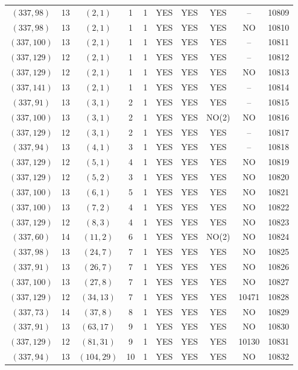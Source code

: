 \begin{longtable}{|c|c|c|c|c|c|c|c|c|c|}
$(337, 98)$ & 13 & $(2, 1)$ & 1 & 1 & YES & YES & YES & -- & 10809\\
$(337, 98)$ & 13 & $(2, 1)$ & 1 & 1 & YES & YES & YES & NO & 10810\\
$(337, 100)$ & 13 & $(2, 1)$ & 1 & 1 & YES & YES & YES & -- & 10811\\
$(337, 129)$ & 12 & $(2, 1)$ & 1 & 1 & YES & YES & YES & -- & 10812\\
$(337, 129)$ & 12 & $(2, 1)$ & 1 & 1 & YES & YES & YES & NO & 10813\\
$(337, 141)$ & 13 & $(2, 1)$ & 1 & 1 & YES & YES & YES & -- & 10814\\
$(337, 91)$ & 13 & $(3, 1)$ & 2 & 1 & YES & YES & YES & -- & 10815\\
$(337, 100)$ & 13 & $(3, 1)$ & 2 & 1 & YES & YES & NO(2) & NO & 10816\\
$(337, 129)$ & 12 & $(3, 1)$ & 2 & 1 & YES & YES & YES & -- & 10817\\
$(337, 94)$ & 13 & $(4, 1)$ & 3 & 1 & YES & YES & YES & -- & 10818\\
$(337, 129)$ & 12 & $(5, 1)$ & 4 & 1 & YES & YES & YES & NO & 10819\\
$(337, 129)$ & 12 & $(5, 2)$ & 3 & 1 & YES & YES & YES & NO & 10820\\
$(337, 100)$ & 13 & $(6, 1)$ & 5 & 1 & YES & YES & YES & NO & 10821\\
$(337, 100)$ & 13 & $(7, 2)$ & 4 & 1 & YES & YES & YES & NO & 10822\\
$(337, 129)$ & 12 & $(8, 3)$ & 4 & 1 & YES & YES & YES & NO & 10823\\
$(337, 60)$ & 14 & $(11, 2)$ & 6 & 1 & YES & YES & NO(2) & NO & 10824\\
$(337, 98)$ & 13 & $(24, 7)$ & 7 & 1 & YES & YES & YES & NO & 10825\\
$(337, 91)$ & 13 & $(26, 7)$ & 7 & 1 & YES & YES & YES & NO & 10826\\
$(337, 100)$ & 13 & $(27, 8)$ & 7 & 1 & YES & YES & YES & NO & 10827\\
$(337, 129)$ & 12 & $(34, 13)$ & 7 & 1 & YES & YES & YES & 10471 & 10828\\
$(337, 73)$ & 14 & $(37, 8)$ & 8 & 1 & YES & YES & YES & NO & 10829\\
$(337, 91)$ & 13 & $(63, 17)$ & 9 & 1 & YES & YES & YES & NO & 10830\\
$(337, 129)$ & 12 & $(81, 31)$ & 9 & 1 & YES & YES & YES & 10130 & 10831\\
$(337, 94)$ & 13 & $(104, 29)$ & 10 & 1 & YES & YES & YES & NO & 10832\\

\end{longtable}
